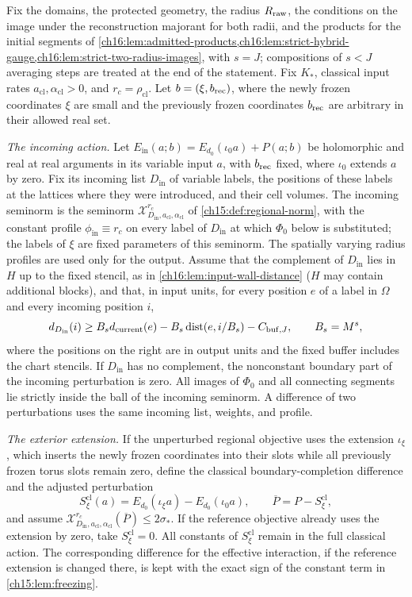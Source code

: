 \begin{theorem}\label{ch16:thm:controlled-perturbation}
Fix the domains, the protected geometry, the radius $R_{\mathrm{raw}}$, the conditions on the image under the reconstruction majorant for both radii, and the products for the initial segments of \cref{ch16:lem:admitted-products,ch16:lem:strict-hybrid-gauge,ch16:lem:strict-two-radius-images}, with $s=J$; compositions of $s<J$ averaging steps are treated at the end of the statement. Fix $K_*$, classical input rates $a_{\mathrm{cl}},\alpha_{\mathrm{cl}}>0$, and $r_c=\rho_{\mathrm{cl}}$. Let $b=(\xi,b_{\mathrm{rec}})$, where the newly frozen coordinates $\xi$ are small and the previously frozen coordinates $b_{\mathrm{rec}}$ are arbitrary in their allowed real set.

\emph{The incoming action.} Let $E_{\mathrm{in}}(a;b)=E_{d_0}(\iota_0a)+P(a;b)$ be holomorphic and real at real arguments in its variable input $a$, with $b_{\mathrm{rec}}$ fixed, where $\iota_0$ extends $a$ by zero. Fix its incoming list $D_{\mathrm{in}}$ of variable labels, the positions of these labels at the lattices where they were introduced, and their cell volumes. The incoming seminorm is the seminorm $\mathcal X_{D_{\mathrm{in}},a_{\mathrm{cl}},\alpha_{\mathrm{cl}}}^{r_c}$ of \cref{ch15:def:regional-norm}, with the constant profile $\phi_{\mathrm{in}}\equiv r_c$ on every label of $D_{\mathrm{in}}$ at which $\Phi_0$ below is substituted; the labels of $\xi$ are fixed parameters of this seminorm. The spatially varying radius profiles are used only for the output. Assume that the complement of $D_{\mathrm{in}}$ lies in $H$ up to the fixed stencil, as in \cref{ch16:lem:input-wall-distance} ($H$ may contain additional blocks), and that, in input units, for every position $e$ of a label in $\Omega$ and every incoming position $i$,
\[
 d_{D_{\mathrm{in}}}(i)\ge
 B_s d_{\mathrm{current}}(e)
       -B_s\operatorname{dist}(e,i/B_s)-C_{\mathrm{buf},J},
 \qquad B_s=M^s,
\]
where the positions on the right are in output units and the fixed buffer includes the chart stencils. If $D_{\mathrm{in}}$ has no complement, the nonconstant boundary part of the incoming perturbation is zero. All images of $\Phi_0$ and all connecting segments lie strictly inside the ball of the incoming seminorm. A difference of two perturbations uses the same incoming list, weights, and profile.

\emph{The exterior extension.} If the unperturbed regional objective uses the extension $\iota_\xi$, which inserts the newly frozen coordinates into their slots while all previously frozen torus slots remain zero, define the classical boundary-completion difference and the adjusted perturbation
\[
 S_\xi^{\mathrm{cl}}(a)=E_{d_0}(\iota_\xi a)-E_{d_0}(\iota_0a),
 \qquad\overline P=P-S_\xi^{\mathrm{cl}},
\]
and assume $\mathcal X_{D_{\mathrm{in}},a_{\mathrm{cl}},\alpha_{\mathrm{cl}}}^{r_c}(\overline P)\le2\sigma_*$. If the reference objective already uses the extension by zero, take $S_\xi^{\mathrm{cl}}=0$. All constants of $S_\xi^{\mathrm{cl}}$ remain in the full classical action. The corresponding difference for the effective interaction, if the reference extension is changed there, is kept with the exact sign of the constant term in \cref{ch15:lem:freezing}.


\end{theorem}
